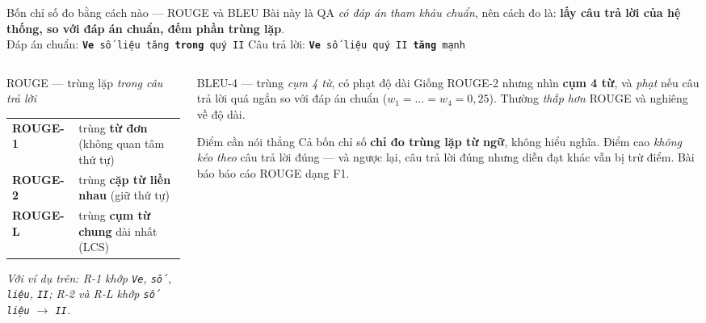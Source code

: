 \documentclass[aspectratio=169,10pt]{beamer}
\begin{document}
\begin{frame}{Bốn chỉ số đo bằng cách nào --- ROUGE và BLEU}
  {\footnotesize Bài này là QA \emph{có đáp án tham khảu chuẩn}, nên cách đo là:
  \textbf{lấy câu trả lời của hệ thống, so với đáp án chuẩn, đếm phần trùng lặp}.\\[2pt]
  Đáp án chuẩn: \texttt{\textbf{Ve} số liệu tăng \textbf{trong} quý II}\qquad
  Câu trả lời: \texttt{\textbf{Ve} số liệu quý II \textbf{tăng} mạnh}}
  \begin{columns}[T]
    \begin{column}{0.52\textwidth}
      \begin{block}{\small ROUGE --- trùng lặp \emph{trong câu trả lời}}
        \footnotesize
        \begin{tabular}{@{}ll@{}}
          \textbf{ROUGE-1} & trùng \textbf{từ đơn} (không quan tâm thứ tự) \\
          \textbf{ROUGE-2} & trùng \textbf{cặp từ liền nhau} (giữ thứ tự) \\
          \textbf{ROUGE-L} & trùng \textbf{cụm từ chung} dài nhất (LCS)
        \end{tabular}
        \vspace{0.2em}
        {\footnotesize\itshape Với ví dụ trên: R-1 khớp \texttt{Ve}, \texttt{số}, \texttt{liệu},
        \texttt{II}; R-2 và R-L khớp \texttt{số liệu} $\to$ \texttt{II}.}
      \end{block}
    \end{column}
    \begin{column}{0.44\textwidth}
      \begin{block}{\small BLEU-4 --- trùng \emph{cụm 4 từ}, có phạt độ dài}
        \footnotesize Giống ROUGE-2 nhưng nhìn \textbf{cụm 4 từ}, và \emph{phạt} nếu câu trả
        lời quá ngắn so với đáp án chuẩn ($w_1 = \dots = w_4 = 0{,}25$).
        Thường \emph{thấp hơn} ROUGE và nghiêng về độ dài.
      \end{block}
      \begin{alertblock}{\small Điểm cần nói thẳng}
        \footnotesize Cả bốn chỉ số \textbf{chỉ đo trùng lặp từ ngữ}, không hiểu nghĩa.
        Điểm cao \emph{không kéo theo} câu trả lời đúng --- và ngược lại, câu trả lời đúng
        nhưng diễn đạt khác vẫn bị trừ điểm. Bài báo báo cáo ROUGE dạng F1.
      \end{alertblock}
    \end{column}
  \end{columns}
\end{frame}
\end{document}
